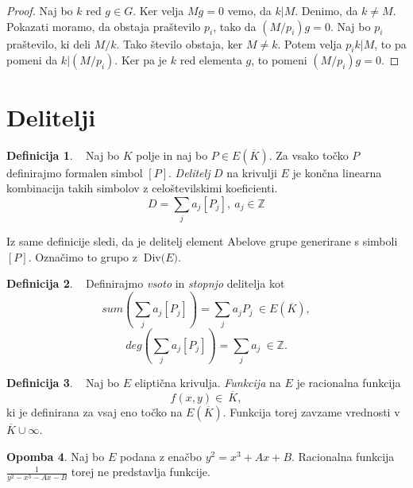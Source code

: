 \documentclass[12pt,a4paper,twoside]{article}
\theoremstyle{definition} %
\newtheorem{definicija}{Definicija}[section]
\newtheorem{opomba}[definicija]{Opomba}
\theoremstyle{plain} %
\numberwithin{equation}{section}  %
\newcommand{\Z}{\mathbb Z}
\newcommand{\E}[1]{E({#1})}
\newcommand{\DIV}[1]{\ \text{Div(}{#1}\text{)}}
\begin{document}
\begin{proof}

Naj bo $k$ red $g\in G$. Ker velja $Mg = 0$ vemo, da $k|M$. Denimo, da $k \neq M$. Pokazati moramo, da obstaja praštevilo $p_i$, tako da $(M/p_i)g = 0$. Naj bo $p_i$ praštevilo, ki deli $M/k$. Tako število obstaja, ker $M \neq k$. Potem velja $p_ik|M$, to pa pomeni da $k|(M/p_i)$. Ker pa je $k$ red elementa $g$, to pomeni $(M/p_i)g = 0$.

\end{proof}



\section{Delitelji}

\begin{definicija}~
Naj bo $K$ polje in naj bo $P \in \E{\overline{K}}$. Za vsako točko $P$ definirajmo formalen simbol $[P]$. \emph{Delitelj} $D$ na krivulji $E$ je končna linearna kombinacija takih simbolov z celoštevilskimi koeficienti.
$$D = \sum_{j}a_j[P_j], \ a_j \in \Z $$

\end{definicija}

Iz same definicije sledi, da je delitelj element Abelove grupe generirane s simboli $[P]$. Označimo to grupo z $\DIV{E}$.


\begin{definicija}~
Definirajmo \emph{vsoto} in \emph{stopnjo} delitelja kot
$$sum(\sum_{j}a_j[P_j]) = \sum_ja_jP_j \ \in \E{\overline{K}},$$
$$deg(\sum_{j}a_j[P_j]) = \sum_ja_j \ \in \Z.$$

\end{definicija}


\begin{definicija}~
Naj bo $E$ eliptična krivulja. \emph{Funkcija} na $E$ je racionalna funkcija $$f(x,y) \in \ \overline{K},$$ ki je definirana za vsaj eno točko na $\E{\overline{K}}$. Funkcija torej zavzame vrednosti v $\overline{K} \cup {\infty}$.
\end{definicija}

\begin{opomba}
Naj bo $E$ podana z enačbo $y^2 = x^3+Ax+B$. Racionalna funkcija $\frac{1}{y^2-x^3-Ax-B}$ torej ne predstavlja funkcije.

\end{opomba}
\end{document}
